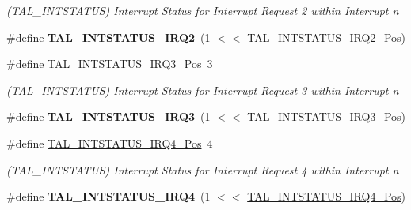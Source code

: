 \begin{DoxyCompactItemize}
\begin{DoxyCompactList}\small\item\em (T\+A\+L\+\_\+\+I\+N\+T\+S\+T\+A\+T\+U\+S) Interrupt Status for Interrupt Request 2 within Interrupt n \end{DoxyCompactList}\item 
\hypertarget{group___s_a_m_l21___t_a_l_ga9e04d4c3cb774f11e0b8bc06eea797df}{}\#define {\bfseries T\+A\+L\+\_\+\+I\+N\+T\+S\+T\+A\+T\+U\+S\+\_\+\+I\+R\+Q2}~(1 $<$$<$ \hyperlink{group___s_a_m_l21___t_a_l_gace5952f437d1963b04816383ff3d0c8e}{T\+A\+L\+\_\+\+I\+N\+T\+S\+T\+A\+T\+U\+S\+\_\+\+I\+R\+Q2\+\_\+\+Pos})\label{group___s_a_m_l21___t_a_l_ga9e04d4c3cb774f11e0b8bc06eea797df}

\item 
\hypertarget{group___s_a_m_l21___t_a_l_ga0c2b97b66d073b62bb0bd4bb63e35003}{}\#define \hyperlink{group___s_a_m_l21___t_a_l_ga0c2b97b66d073b62bb0bd4bb63e35003}{T\+A\+L\+\_\+\+I\+N\+T\+S\+T\+A\+T\+U\+S\+\_\+\+I\+R\+Q3\+\_\+\+Pos}~3\label{group___s_a_m_l21___t_a_l_ga0c2b97b66d073b62bb0bd4bb63e35003}

\begin{DoxyCompactList}\small\item\em (T\+A\+L\+\_\+\+I\+N\+T\+S\+T\+A\+T\+U\+S) Interrupt Status for Interrupt Request 3 within Interrupt n \end{DoxyCompactList}\item 
\hypertarget{group___s_a_m_l21___t_a_l_gae070c5e2ed1b76456e0d8e89096efd38}{}\#define {\bfseries T\+A\+L\+\_\+\+I\+N\+T\+S\+T\+A\+T\+U\+S\+\_\+\+I\+R\+Q3}~(1 $<$$<$ \hyperlink{group___s_a_m_l21___t_a_l_ga0c2b97b66d073b62bb0bd4bb63e35003}{T\+A\+L\+\_\+\+I\+N\+T\+S\+T\+A\+T\+U\+S\+\_\+\+I\+R\+Q3\+\_\+\+Pos})\label{group___s_a_m_l21___t_a_l_gae070c5e2ed1b76456e0d8e89096efd38}

\item 
\hypertarget{group___s_a_m_l21___t_a_l_gafb06680b4e5e01e8f34d498b6d13cddc}{}\#define \hyperlink{group___s_a_m_l21___t_a_l_gafb06680b4e5e01e8f34d498b6d13cddc}{T\+A\+L\+\_\+\+I\+N\+T\+S\+T\+A\+T\+U\+S\+\_\+\+I\+R\+Q4\+\_\+\+Pos}~4\label{group___s_a_m_l21___t_a_l_gafb06680b4e5e01e8f34d498b6d13cddc}

\begin{DoxyCompactList}\small\item\em (T\+A\+L\+\_\+\+I\+N\+T\+S\+T\+A\+T\+U\+S) Interrupt Status for Interrupt Request 4 within Interrupt n \end{DoxyCompactList}\item 
\hypertarget{group___s_a_m_l21___t_a_l_gac92bace2409d2c6a9da1d69d40e62887}{}\#define {\bfseries T\+A\+L\+\_\+\+I\+N\+T\+S\+T\+A\+T\+U\+S\+\_\+\+I\+R\+Q4}~(1 $<$$<$ \hyperlink{group___s_a_m_l21___t_a_l_gafb06680b4e5e01e8f34d498b6d13cddc}{T\+A\+L\+\_\+\+I\+N\+T\+S\+T\+A\+T\+U\+S\+\_\+\+I\+R\+Q4\+\_\+\+Pos})\label{group___s_a_m_l21___t_a_l_gac92bace2409d2c6a9da1d69d40e62887}


\end{DoxyCompactItemize}
